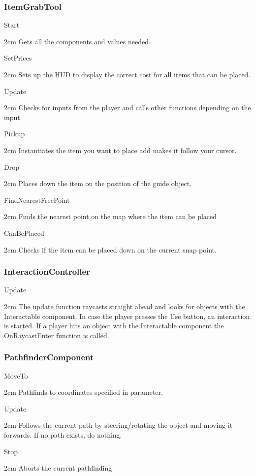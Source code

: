 \documentclass[11pt]{article}
\newenvironment{indentall}{\begin{adjustwidth}{2cm}{}}{\end{adjustwidth}}
\begin{document}
\newpage

\subsubsection{ItemGrabTool}
Start
\begin{indentall}
Gets all the components and values needed.
\end{indentall}
SetPrices
\begin{indentall}
Sets up the HUD to display the correct cost for all items that can be placed.
\end{indentall}
Update
\begin{indentall}
Checks for inputs from the player and calls other functions depending on the input.
\end{indentall}
Pickup
\begin{indentall}
Instantiates the item you want to place add makes it follow your cursor.
\end{indentall}
Drop
\begin{indentall}
Places down the item on the position of the guide object.
\end{indentall}
FindNearestFreePoint
\begin{indentall}
Finds the nearest point on the map where the item can be placed
\end{indentall}
CanBePlaced
\begin{indentall}
Checks if the item can be placed down on the current snap point.
\end{indentall}

\subsubsection{InteractionController}
Update
\begin{indentall}
The update function raycasts straight ahead and looks for objects with the Interactable component. In case the player presses the Use button, an interaction is started. If a player hits an object with the Interactable component the OnRaycastEnter function is called.
\end{indentall}

\subsubsection{PathfinderComponent}
MoveTo
\begin{indentall}
Pathfinds to coordinates specified in parameter.
\end{indentall}
Update
\begin{indentall}
Follows the current path by steering/rotating the object and moving it forwards. If no path exists, do nothing.
\end{indentall}
Stop
\begin{indentall}
Aborts the current pathfinding
\end{indentall}
\end{document}
